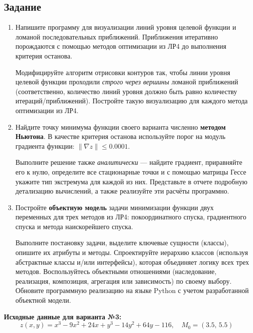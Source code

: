 \subsection{Задание}

\begin{enumerate}
    \item Напишите программу для визуализации линий уровня целевой функции и ломаной последовательных приближений. Приближения итеративно порождаются с помощью методов оптимизации из ЛР4 до выполнения критерия останова. 
    
    Модифицируйте алгоритм отрисовки контуров так, чтобы линии уровня целевой функции проходили \textit{строго через вершины} ломаной приближений (соответственно, количество линий уровня должно быть равно количеству итераций/приближений). Постройте такую визуализацию для каждого метода оптимизации из ЛР4.

    \item Найдите точку минимума функции своего варианта численно \textbf{методом Ньютона}. В качестве критерия останова используйте порог на модуль градиента функции: $\|\nabla z\| \le 0.0001$.
    
    Выполните решение также \textit{аналитически} — найдите градиент, приравняйте его к нулю, определите все стационарные точки и с помощью матрицы Гессе укажите тип экстремума для каждой из них. Представьте в отчете подробную детализацию вычислений, а также реализуйте эти расчёты программно.

    \item Постройте \textbf{объектную модель} задачи минимизации функции двух переменных для трех методов из ЛР4: покоординатного спуска, градиентного спуска и метода наискорейшего спуска. 
    
    Выполните постановку задачи, выделите ключевые сущности (классы), опишите их атрибуты и методы. Спроектируйте иерархию классов (используя абстрактные классы и/или интерфейсы), которая объединяет логику всех трех методов. Воспользуйтесь объектными отношениями (наследование, реализация, композиция, агрегация или зависимость) по своему выбору. Обновите программную реализацию на языке Python с учетом разработанной объектной модели.
\end{enumerate}

\textbf{Исходные данные для варианта №3:}
\[
    z(x,y) = x^3 - 9x^2 + 24x + y^3 - 14y^2 + 64y - 116, \quad M_0 = (3.5, \, 5.5)
\]